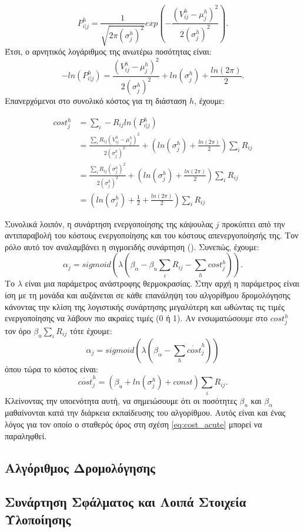 \begin{itemize}
  \begin{equation}
    P^h_{i|j} = \frac{1}{\sqrt{2\pi(\sigma_j^h)^2}}exp(-\frac{(V_{ij}^h-\mu_j^h)^2}{2(\sigma_j^h)^2}).
  \end{equation}
  Έτσι, ο αρνητικός λογάριθμος της ανωτέρω ποσότητας είναι:
  \begin{equation}
    -ln(P^h_{i|j}) = \frac{(V_{ij}^h-\mu_j^h)^2}{2(\sigma_j^h)^2} + ln(\sigma_j^h) + \frac{ln(2\pi)}{2}.
  \end{equation}
  Επανερχόμενοι στο συνολικό κόστος για τη διάσταση $h$, έχουμε:

  \begin{align}
    cost_j^h &= \sum_i - R_{ij} ln(P^h_{i|j}) \\ &= \frac{\sum_i R_{ij}(V_{ij}^h - \mu_j^h)^2}{2(\sigma_j^h)^2} + (ln(\sigma_j^h) + \frac{ln(2\pi)}{2})\sum_i R_{ij} \\ &= \frac{\sum_i R_{ij}(\sigma_j^h)^2}{2(\sigma_j^h)^2} + (ln(\sigma_j^h) + \frac{ln(2\pi)}{2})\sum_i R_{ij}  \\ &= (ln(\sigma_j^h) + \frac{1}{2} + \frac{ln(2\pi)}{2})\sum_i R_{ij} 
  \end{align}
\end{itemize}

Συνολικά λοιπόν, η συνάρτηση ενεργοποίησης της κάψουλας $j$ προκύπτει από την αντιπαραβολή του κόστους ενεργοποίησης και του κόστους απενεργοποίησής της. Τον ρόλο αυτό τον αναλαμβάνει η σιγμοειδής συνάρτηση (). Συνεπώς, έχουμε:
\begin{equation}
  \alpha_j = sigmoid(\lambda(\beta_{\alpha} - \beta_u \sum_i R_{ij} - \sum_h cost_j^h)).
\end{equation}
Το $\lambda$ είναι μια παράμετρος ανάστροφης θερμοκρασίας. Στην αρχή η παράμετρος είναι ίση με τη μονάδα και αυξάνεται σε κάθε επανάληψη του αλγορίθμου δρομολόγησης κάνοντας την κλίση της λογιστικής συνάρτησης μεγαλύτερη και ωθώντας τις τιμές ενεργοποίησης να λάβουν πιο ακραίες τιμές (0 ή 1). Αν ενσωματώσουμε στο $cost_j^h$ τον όρο $\beta_u \sum_i R_{ij}$ τότε έχουμε:
\begin{equation}
  \alpha_j = sigmoid(\lambda(\beta_{\alpha} - \sum_h \acute{cost}_j^h))
\end{equation}
όπου τώρα το κόστος είναι:
\begin{equation}
  \label{eq:cost_acute}
  \acute{cost} _j^h = (\beta_u + ln(\sigma_j^h) + const)\sum_i R_{ij}.
\end{equation}
Κλείνοντας την υποενότητα αυτή, να σημειώσουμε ότι οι ποσότητες $\beta_u$ και $\beta_{\alpha}$ μαθαίνονται κατά την διάρκεια εκπαίδευσης του αλγορίθμου. Αυτός είναι και ένας λόγος για τον οποίο ο σταθερός όρος στη σχέση \ref{eq:cost_acute} μπορεί να παραληφθεί.

\subsection{Αλγόριθμος Δρομολόγησης }



\subsection{Συνάρτηση Σφάλματος και Λοιπά Στοιχεία Υλοποίησης}

